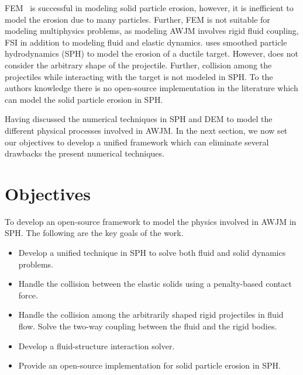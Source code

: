FEM~\citep{takaffoli2009finite} is successful in modeling solid particle
erosion, however, it is inefficient to model the erosion due to many particles.
Further, FEM is not suitable for modeling multiphysics problems, as modeling
AWJM involves rigid fluid coupling, FSI in addition to modeling fluid and elastic
dynamics. \cite{dong2016smoothed} uses smoothed particle hydrodynamics (SPH) to
model the erosion of a ductile target. However, \cite{dong2016smoothed} does not
consider the arbitrary shape of the projectile. Further, collision among the
projectiles while interacting with the target is not modeled in SPH. To the
authors knowledge there is no open-source implementation in the literature which
can model the solid particle erosion in SPH.

Having discussed the numerical techniques in SPH and DEM to model the different
physical processes involved in AWJM. In the next section, we now set our
objectives to develop a unified framework which can eliminate several drawbacks
the present numerical techniques.

\section{Objectives}
To develop an open-source framework to model the physics involved in AWJM in SPH.
The following are the key goals of the work.
\begin{itemize}
\item Develop a unified technique in SPH to solve both fluid and solid dynamics
  problems.
\item Handle the collision between the elastic solids using a penalty-based contact force.
\item Handle the collision among the arbitrarily shaped rigid projectiles in fluid
  flow. Solve the two-way coupling between the fluid and the rigid bodies.
\item Develop a fluid-structure interaction solver.
\item Provide an open-source implementation for solid particle erosion in SPH.
\end{itemize}


